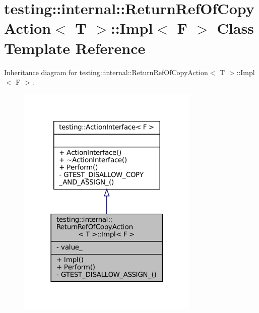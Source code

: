 \hypertarget{classtesting_1_1internal_1_1ReturnRefOfCopyAction_1_1Impl}{}\section{testing\+:\+:internal\+:\+:Return\+Ref\+Of\+Copy\+Action$<$ T $>$\+:\+:Impl$<$ F $>$ Class Template Reference}
\label{classtesting_1_1internal_1_1ReturnRefOfCopyAction_1_1Impl}


Inheritance diagram for testing\+:\+:internal\+:\+:Return\+Ref\+Of\+Copy\+Action$<$ T $>$\+:\+:Impl$<$ F $>$\+:
\nopagebreak
\begin{figure}[H]
\begin{center}
\leavevmode
\includegraphics[width=246pt]{classtesting_1_1internal_1_1ReturnRefOfCopyAction_1_1Impl__inherit__graph}
\end{center}
\end{figure}


